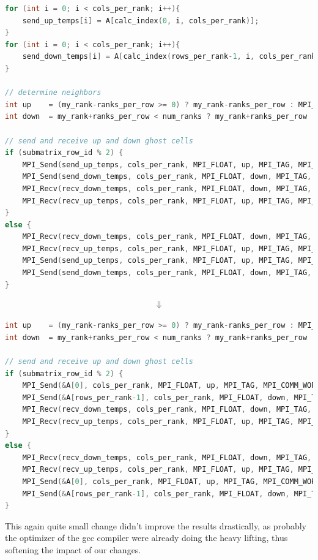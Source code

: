 \documentclass[UTF-8]{article}
\begin{document}
\begin{itemize}
	\begin{lstlisting}[language=c]
for (int i = 0; i < cols_per_rank; i++){
	send_up_temps[i] = A[calc_index(0, i, cols_per_rank)];
}
for (int i = 0; i < cols_per_rank; i++){
	send_down_temps[i] = A[calc_index(rows_per_rank-1, i, cols_per_rank)];
}

// determine neighbors
int up    = (my_rank-ranks_per_row >= 0) ? my_rank-ranks_per_row : MPI_PROC_NULL;
int down  = my_rank+ranks_per_row < num_ranks ? my_rank+ranks_per_row : MPI_PROC_NULL;

// send and receive up and down ghost cells
if (submatrix_row_id % 2) {
	MPI_Send(send_up_temps, cols_per_rank, MPI_FLOAT, up, MPI_TAG, MPI_COMM_WORLD);
	MPI_Send(send_down_temps, cols_per_rank, MPI_FLOAT, down, MPI_TAG, MPI_COMM_WORLD);
	MPI_Recv(recv_down_temps, cols_per_rank, MPI_FLOAT, down, MPI_TAG, MPI_COMM_WORLD, MPI_STATUS_IGNORE);
	MPI_Recv(recv_up_temps, cols_per_rank, MPI_FLOAT, up, MPI_TAG, MPI_COMM_WORLD, MPI_STATUS_IGNORE);
}
else {
	MPI_Recv(recv_down_temps, cols_per_rank, MPI_FLOAT, down, MPI_TAG, MPI_COMM_WORLD, MPI_STATUS_IGNORE);
	MPI_Recv(recv_up_temps, cols_per_rank, MPI_FLOAT, up, MPI_TAG, MPI_COMM_WORLD, MPI_STATUS_IGNORE);
	MPI_Send(send_up_temps, cols_per_rank, MPI_FLOAT, up, MPI_TAG, MPI_COMM_WORLD);
	MPI_Send(send_down_temps, cols_per_rank, MPI_FLOAT, down, MPI_TAG, MPI_COMM_WORLD);
}
\end{lstlisting}
\begin{align*}
	\Downarrow
\end{align*}
\begin{lstlisting}[language=c]
int up    = (my_rank-ranks_per_row >= 0) ? my_rank-ranks_per_row : MPI_PROC_NULL;
int down  = my_rank+ranks_per_row < num_ranks ? my_rank+ranks_per_row : MPI_PROC_NULL;

// send and receive up and down ghost cells
if (submatrix_row_id % 2) {
	MPI_Send(&A[0], cols_per_rank, MPI_FLOAT, up, MPI_TAG, MPI_COMM_WORLD);
	MPI_Send(&A[rows_per_rank-1], cols_per_rank, MPI_FLOAT, down, MPI_TAG, MPI_COMM_WORLD);
	MPI_Recv(recv_down_temps, cols_per_rank, MPI_FLOAT, down, MPI_TAG, MPI_COMM_WORLD, MPI_STATUS_IGNORE);
	MPI_Recv(recv_up_temps, cols_per_rank, MPI_FLOAT, up, MPI_TAG, MPI_COMM_WORLD, MPI_STATUS_IGNORE);
}
else {
	MPI_Recv(recv_down_temps, cols_per_rank, MPI_FLOAT, down, MPI_TAG, MPI_COMM_WORLD, MPI_STATUS_IGNORE);
	MPI_Recv(recv_up_temps, cols_per_rank, MPI_FLOAT, up, MPI_TAG, MPI_COMM_WORLD, MPI_STATUS_IGNORE);
	MPI_Send(&A[0], cols_per_rank, MPI_FLOAT, up, MPI_TAG, MPI_COMM_WORLD);
	MPI_Send(&A[rows_per_rank-1], cols_per_rank, MPI_FLOAT, down, MPI_TAG, MPI_COMM_WORLD);
}\end{lstlisting}
This again quite small change didn't improve the results drastically, as probably the optimizer of the gcc compiler were already doing the heavy lifting, thus softening the impact of our changes.



\end{itemize}
\end{document}
